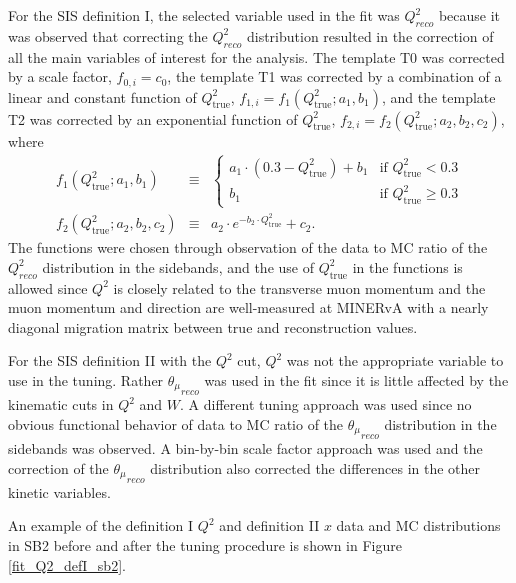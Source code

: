 \documentclass[aps, prd, twocolumn, showpacs, superscriptaddress, floatfix]{revtex4-2}
\begin{document}
For the SIS definition I, the selected variable used in the fit was $Q^2_{reco}$ because it was observed that correcting the $Q^2_{reco}$ distribution resulted in the correction of all the main variables of interest for the analysis. The template T0 was corrected by a scale factor, $f_{0,i} = c_0$, the template T1 was corrected by a combination of a linear and constant function of $Q^{2}_\mathrm{true}$, $f_{1,i} = f_{1}(Q^{2}_\mathrm{true};a_1,b_1)$, and the template T2 was corrected by an exponential function of $Q^{2}_\mathrm{true}$, $f_{2,i} = f_{2}(Q^{2}_\mathrm{true};a_2,b_2,c_2)$, where
{\footnotesize
\begin{eqnarray}
    f_{1}(Q^{2}_\mathrm{true};a_1,b_1) &\equiv& \left\{ \begin{array}{ll}
    a_1{\cdot}(0.3 - Q^{2}_\mathrm{true}) + b_1  & \mbox{if } Q^{2}_\mathrm{true} < 0.3 \\
    b_1 & \mbox{if } Q^{2}_\mathrm{true} \geq 0.3
    \end{array} \right. \\
    f_{2}(Q^{2}_\mathrm{true};a_2,b_2,c_2) &\equiv& a_2{\cdot}e^{-b_2{\cdot}Q^{2}_\mathrm{true}} + c_2.
\end{eqnarray}
}
The functions were chosen through observation of the data to MC ratio of the $Q^2_{reco}$ distribution in the sidebands, and the use of $Q^{2}_\mathrm{true}$ in the functions is allowed since $Q^2$ is closely related to the transverse muon momentum and the muon momentum and direction are well-measured at MINERvA with a nearly diagonal migration matrix between true and reconstruction values.

For the SIS definition II with the $Q^2$ cut, $Q^2$ was not the appropriate variable to use in the tuning. Rather ${\theta_\mu}_{reco}$ was used in the fit since it is little affected by the kinematic cuts in $Q^2$ and $W$. A different tuning approach was used since no obvious functional behavior of data to MC ratio of the ${\theta_\mu}_{reco}$ distribution in the sidebands was observed. A bin-by-bin scale factor approach was used and the correction of the ${\theta_\mu}_{reco}$ distribution also corrected the differences in the other kinetic variables.

An example of the definition I $Q^2$ and definition II $x$ data and MC distributions in SB2 before and after the tuning procedure is shown in Figure \ref{fit_Q2_defI_sb2}.
\end{document}
